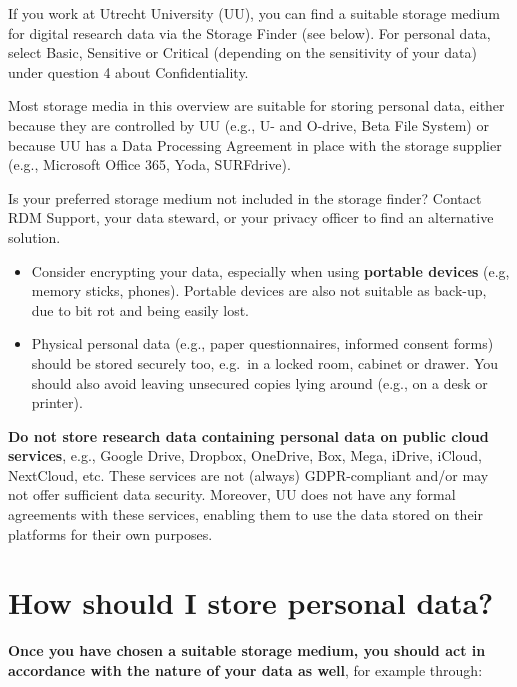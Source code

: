\documentclass[
]{book}
\providecommand{\tightlist}{%
  \setlength{\itemsep}{0pt}\setlength{\parskip}{0pt}}
\begin{document}
If you work at Utrecht University (UU), you can find a suitable storage medium for
digital research data via the Storage Finder (see below). For personal data, select Basic,
Sensitive or Critical (depending on the sensitivity of your data) under question
4 about Confidentiality.

Most storage media in this overview are suitable for storing personal data, either
because they are controlled by UU (e.g., U- and O-drive, Beta File System) or
because UU has a Data Processing Agreement in place with the storage supplier
(e.g., Microsoft Office 365, Yoda, SURFdrive).

Is your preferred storage medium not included in the storage finder? Contact
RDM Support, your data steward, or your
privacy officer to find an alternative solution.

\begin{itemize}
\tightlist
\item
  Consider encrypting your data, especially when using \textbf{portable devices}
  (e.g, memory sticks, phones). Portable devices are also not suitable as back-up,
  due to bit rot and being easily lost.
\item
  Physical personal data (e.g., paper questionnaires, informed consent forms)
  should be stored securely too, e.g.~in a locked room, cabinet or drawer. You
  should also avoid leaving unsecured copies lying around (e.g., on a desk or printer).
\end{itemize}

\textbf{Do not store research data containing personal data on public cloud services},
e.g., Google Drive, Dropbox, OneDrive, Box, Mega, iDrive, iCloud, NextCloud, etc.
These services are not (always) GDPR-compliant and/or may not offer sufficient
data security. Moreover, UU does not have any formal agreements with these
services, enabling them to use the data stored on their platforms for their own
purposes.

\hypertarget{data-storage-how}{%
\section{How should I store personal data?}\label{data-storage-how}}

\textbf{Once you have chosen a suitable storage medium, you should act in accordance
with the nature of your data as well}, for example through:
\end{document}
